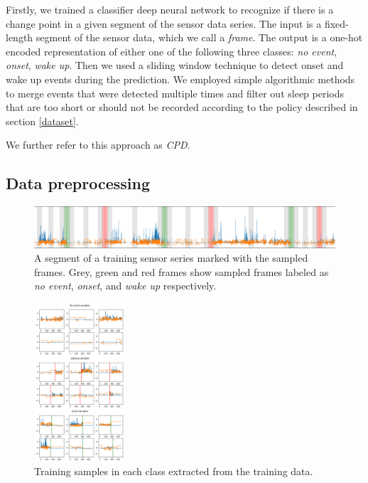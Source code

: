\documentclass{article}
\begin{document}
Firstly, we trained a classifier deep neural network to recognize if there is a change point in a given segment of the sensor data series. The input is a fixed-length segment of the sensor data, which we call a \textit{frame}. The output is a one-hot encoded representation of either one of the following three classes: \textit{no event}, \textit{onset}, \textit{wake up}. Then we used a sliding window technique to detect onset and wake up events during the prediction. We employed simple algorithmic methods to merge events that were detected multiple times and filter out sleep periods that are too short or should not be recorded according to the policy described in section \ref{dataset}.

We further refer to this approach as \textit{CPD}.

\subsection{Data preprocessing}
\begin{figure}
    \centering
    \includegraphics[width=\textwidth]{cpd_sampling.png}
    \caption{A segment of a training sensor series marked with the sampled frames. Grey, green and red frames show sampled frames labeled as \textit{no event}, \textit{onset}, and \textit{wake up} respectively.}
    \label{fig:cpd-sampling}
\end{figure}

\begin{figure}
    \includegraphics[width=0.3\textwidth]{cpd_samples.png}
    \caption{Training samples in each class extracted from the training data.}
    \label{fig:cpd-samples}
\end{figure}
\end{document}
